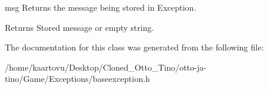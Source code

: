 msg Returns the message being stored in Exception. 

\begin{DoxyReturn}{Returns}
Stored message or empty string. 
\end{DoxyReturn}


The documentation for this class was generated from the following file\-:\begin{DoxyCompactItemize}
\item 
/home/kaartovu/\-Desktop/\-Cloned\-\_\-\-Otto\-\_\-\-Tino/otto-\/ja-\/tino/\-Game/\-Exceptions/baseexception.\-h\end{DoxyCompactItemize}
